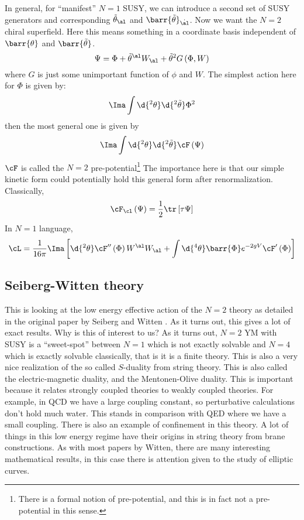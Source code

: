 \documentclass{booc}
\begin{document}
In general, for ``manifest'' $N = 1$ SUSY, 
we can introduce a second set of SUSY generators and corresponding $\tilde\theta_\al$
and $\barr{\Tilde{\theta}}_{\dot{\al}}$. 
Now we want the $N  = 2$ chiral superfield. 
Here this means something in a coordinate basis independent of $\barr{\theta}$ and 
$\barr{\tilde \theta}$.
\begin{equation}
\Psi = \Phi + \tilde \theta^\al W_\al + \tilde \theta^2 G\left( \Phi , W \right)
\end{equation}
where $G$ is just some unimportant function of $\phi$ and $W$.
The simplest action here for $\Phi$ is given by:
\begin{equation}
\Ima \int \d{^2 \theta}\d{^2 \tilde \theta} \Phi^2
\end{equation}
then the most general one is given by
\begin{equation}
\Ima \int \d{^2 \theta} \d{^2 \tilde \theta} \cF\left( \Psi \right)
\end{equation}
$\cF$ is called the $N = 2$ pre-potential\footnote{
There is a formal notion of pre-potential, and this is in fact not a pre-potential in this sense.}
The importance here is that our simple kinetic form could potentially hold this 
general form after renormalization.
Classically,
\begin{equation}
\cF_{\cl}\left( \Psi \right) = \frac{1}{2} \tr\left[ \tau \Psi \right]
\end{equation}
In $N = 1$ language,
\begin{equation}
\cL = \frac{1}{16\pi}
\Ima\left[ \d{^2 \theta}
\cF''\left( \Phi \right) W^\al W_\al + 
\int \d{^4 \theta} \barr{\Phi} e^{-2g V} \cF'\left( \Phi \right)
\right] 
\end{equation}

\subsection{Seiberg-Witten theory}

This is looking at the low energy effective action of the $N = 2$ theory
as detailed in the original paper by Seiberg and Witten \cite{seiberg_witten}.
As it turns out, this gives a lot of exact results.
Why is this of interest to us?
As it turns out, $N = 2$ YM with SUSY is a ``sweet-spot'' between
$N = 1$ which is not exactly solvable and
$N = 4$ which is exactly solvable classically, that is it is a finite theory.
This is also a very nice realization of the so called $S$-duality from string theory. 
This is also called the electric-magnetic duality, and the Mentonen-Olive duality.
This is important because it relates strongly coupled theories to weakly coupled theories.
For example, in QCD we have a large coupling constant, so perturbative calculations
don't hold much water.
This stands in comparison with QED where we have a small coupling.
There is also an example of confinement in this theory. 
A lot of things in this low energy regime
have their origins in string theory from brane constructions. 
As with most papers by Witten, there are many interesting mathematical results, 
in this case there is attention given to the study of elliptic curves.
\end{document}
